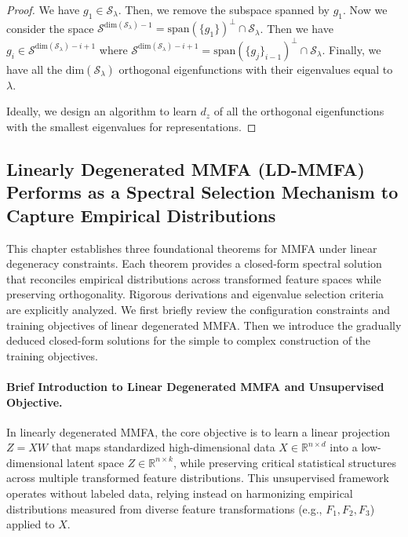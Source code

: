 \documentclass{article}
\begin{document}
\begin{proof}
We have $g_1 \in \mathcal{S}_\lambda$. Then, we remove the subspace spanned by $g_1$. Now we consider the space $\mathcal{S}^{\text{dim}(\mathcal{S}_{\lambda}) - 1} = \text{span}(\{g_1\})^\perp \cap \mathcal{S}_{\lambda}$. Then we have $g_i \in \mathcal{S}^{\text{dim}(\mathcal{S}_{\lambda}) - i + 1}$ where $\mathcal{S}^{\text{dim}(\mathcal{S}_{\lambda}) - i + 1}= \text{span}(\{g_j\}_{i-1})^\perp\cap \mathcal{S}_{\lambda}$. Finally, we have all the $\text{dim}(\mathcal{S}_{\lambda})$ orthogonal eigenfunctions with their eigenvalues equal to $\lambda$.

Ideally, we design an algorithm to learn $d_z$ of all the orthogonal eigenfunctions with the smallest eigenvalues for representations.

\end{proof}

\subsection{Linearly Degenerated MMFA (LD-MMFA) Performs as a Spectral Selection Mechanism to Capture Empirical Distributions}



This chapter establishes three foundational theorems for MMFA under linear degeneracy constraints. Each theorem provides a closed-form spectral solution that reconciles empirical distributions across transformed feature spaces while preserving orthogonality. Rigorous derivations and eigenvalue selection criteria are explicitly analyzed. We first briefly review the configuration constraints and training objectives of linear degenerated MMFA. Then we introduce the gradually deduced closed-form solutions for the simple to complex construction of the training objectives. 

\paragraph{Brief Introduction to Linear Degenerated MMFA and Unsupervised Objective.}\label{sec:recover}

In linearly degenerated MMFA, the core objective is to learn a linear projection \( Z = XW \) that maps standardized high-dimensional data \( X \in \mathbb{R}^{n \times d} \) into a low-dimensional latent space \( Z \in \mathbb{R}^{n \times k} \), while preserving critical statistical structures across multiple transformed feature distributions. This unsupervised framework operates without labeled data, relying instead on harmonizing empirical distributions measured from diverse feature transformations (e.g., \( F_1, F_2, F_3 \)) applied to \( X \). 
\end{document}

